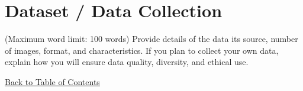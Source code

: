 \section{Dataset / Data Collection}
(Maximum word limit: 100 words)
Provide details of the data its source, number of images, format, and characteristics.  
If you plan to collect your own data, explain how you will ensure data quality, diversity, and ethical use.

\hyperref[contents]{\small Back to Table of Contents}
\newpage
